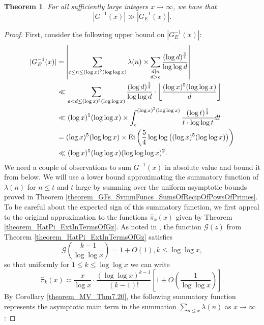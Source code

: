 \documentclass[11pt,reqno,a4letter]{article}
\numberwithin{figure}{section}
\numberwithin{table}{section}
\newcommand{\Floor}[2]{\ensuremath{\left\lfloor \frac{#1}{#2} \right\rfloor}}
\theoremstyle{plain}
\newtheorem{theorem}{Theorem}
\numberwithin{theorem}{section}
\theoremstyle{definition}
\begin{document}
\begin{theorem} 
\label{theorem_GInvxLowerBoundByGEInvx_v1} 
For all sufficiently large integers $x \rightarrow \infty$, we have that 
\[
|G^{-1}(x)| \gg |G_E^{-1}(x)|. 
\]
\end{theorem} 
\begin{proof} 
First, consider the following upper bound on $|G_E^{-1}(x)|$: 
\begin{align} 
\notag 
|G_E^{-1}(x)| & = \left\lvert \sum_{\substack{e \leq n \leq (\log x)^{5} (\log\log x)}} \lambda(n) \times 
     \sum_{\substack{d|n \\ d > e}} \frac{(\log d)^{\frac{3}{4}}}{\log\log d} 
     \right\rvert \\ 
\notag 
     & \ll \sum_{e < d \leq (\log x)^{5} (\log\log x)} \frac{(\log d)^{\frac{1}{4}}}{\log\log d} \cdot 
     \Floor{(\log x)^{5} (\log\log x)}{d} \\ 
\notag 
     & \ll (\log x)^{5} (\log\log x) \times 
     \int_{e}^{(\log x)^{5} (\log\log x)} \frac{(\log t)^{\frac{1}{4}}}{t \cdot \log\log t} dt \\ 
\notag 
     & = (\log x)^{5} (\log\log x) \times 
     \operatorname{Ei}\left(\frac{5}{4} \log\log\left((\log x)^{5} (\log\log x)\right)\right) \\ 
\label{eqn_proof_tag_AbsGEInvx_AsymptoticUpperBound_v1} 
     & \ll (\log x)^{5} (\log\log x) (\log\log\log x)^2. 
\end{align} 
We need a couple of observations to sum $G^{-1}(x)$ in absolute value and bound it from below. 
We will use a lower bound approximating the summatory function of $\lambda(n)$ for $n \leq t$ and 
$t$ large by summing over the uniform asymptotic bounds proved in 
Theorem \ref{theorem_GFs_SymmFuncs_SumsOfRecipOfPowsOfPrimes}. 
To be careful about the expected sign of this summatory function, 
we first appeal to the original approximation to the functions $\widehat{\pi}_k(x)$ 
given by Theorem \ref{theorem_HatPi_ExtInTermsOfGz}. 
As noted in \cite[\S 7.4]{MV}, the function $\mathcal{G}(z)$ from 
Theorem \ref{theorem_HatPi_ExtInTermsOfGz} satisfies 
\[
\mathcal{G}\left(\frac{k-1}{\log\log x}\right) = 1 + O(1), k \leq \log\log x, 
\]
so that uniformly for $1 \leq k \leq \log\log x$ we can write 
\[
\widehat{\pi}_k(x) \asymp \frac{x}{\log x} \cdot \frac{(\log\log x)^{k-1}}{(k-1)!} \left[ 
     1 + O\left(\frac{1}{\log\log x}\right)\right]. 
\]
By Corollary \ref{theorem_MV_Thm7.20}, the 
following summatory function represents the asymptotic main term 
in the summation $\sum_{n \leq x} \lambda(n)$ as $x \rightarrow \infty$: 

\end{proof}
\end{document}
